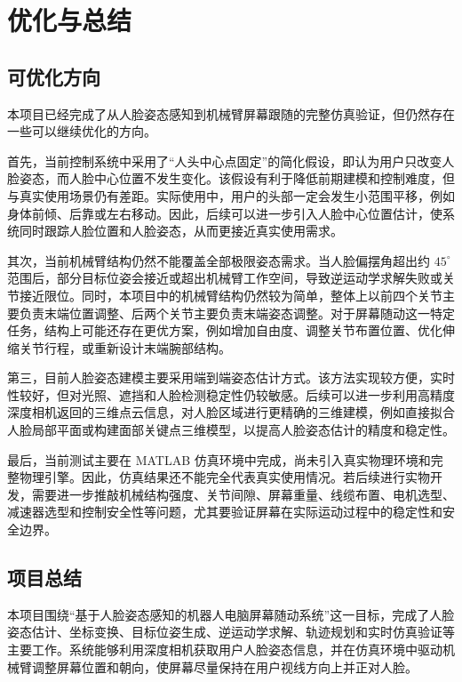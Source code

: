 \documentclass[12pt,a4paper,UTF8]{article}
\begin{document}
\clearpage
\section{优化与总结}

\subsection{可优化方向}

本项目已经完成了从人脸姿态感知到机械臂屏幕跟随的完整仿真验证，但仍然存在一些可以继续优化的方向。

首先，当前控制系统中采用了“人头中心点固定”的简化假设，即认为用户只改变人脸姿态，而人脸中心位置不发生变化。该假设有利于降低前期建模和控制难度，但与真实使用场景仍有差距。实际使用中，用户的头部一定会发生小范围平移，例如身体前倾、后靠或左右移动。因此，后续可以进一步引入人脸中心位置估计，使系统同时跟踪人脸位置和人脸姿态，从而更接近真实使用需求。

其次，当前机械臂结构仍然不能覆盖全部极限姿态需求。当人脸偏摆角超出约 $45^\circ$ 范围后，部分目标位姿会接近或超出机械臂工作空间，导致逆运动学求解失败或关节接近限位。同时，本项目中的机械臂结构仍然较为简单，整体上以前四个关节主要负责末端位置调整、后两个关节主要负责末端姿态调整。对于屏幕随动这一特定任务，结构上可能还存在更优方案，例如增加自由度、调整关节布置位置、优化伸缩关节行程，或重新设计末端腕部结构。

第三，目前人脸姿态建模主要采用端到端姿态估计方式。该方法实现较方便，实时性较好，但对光照、遮挡和人脸检测稳定性仍较敏感。后续可以进一步利用高精度深度相机返回的三维点云信息，对人脸区域进行更精确的三维建模，例如直接拟合人脸局部平面或构建面部关键点三维模型，以提高人脸姿态估计的精度和稳定性。

最后，当前测试主要在 MATLAB 仿真环境中完成，尚未引入真实物理环境和完整物理引擎。因此，仿真结果还不能完全代表真实使用情况。若后续进行实物开发，需要进一步推敲机械结构强度、关节间隙、屏幕重量、线缆布置、电机选型、减速器选型和控制安全性等问题，尤其要验证屏幕在实际运动过程中的稳定性和安全边界。

\subsection{项目总结}

本项目围绕“基于人脸姿态感知的机器人电脑屏幕随动系统”这一目标，完成了人脸姿态估计、坐标变换、目标位姿生成、逆运动学求解、轨迹规划和实时仿真验证等主要工作。系统能够利用深度相机获取用户人脸姿态信息，并在仿真环境中驱动机械臂调整屏幕位置和朝向，使屏幕尽量保持在用户视线方向上并正对人脸。
\end{document}
